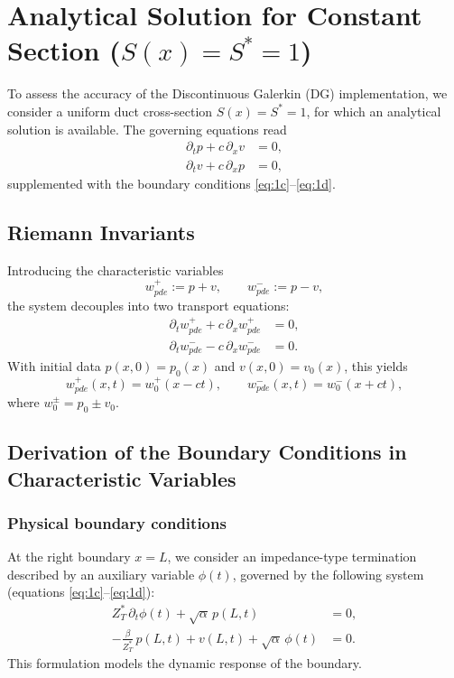 \documentclass[11pt,a4paper]{report}
\theoremstyle{plain}
\theoremstyle{definition}
\begin{document}
\section{Analytical Solution for Constant Section ($S(x)=S^\ast=1$)}

To assess the accuracy of the Discontinuous Galerkin (DG) implementation, we consider a uniform duct cross-section $S(x)=S^\ast=1$, for which an analytical solution is available. The governing equations read
\begin{align}
    \partial_t p + c\,\partial_x v &= 0, \\
    \partial_t v + c\,\partial_x p &= 0,
\end{align}
supplemented with the boundary conditions \eqref{eq:1c}--\eqref{eq:1d}.

\subsection{Riemann Invariants}

Introducing the characteristic variables
\begin{equation}
    w^+_{pde} := p+v, \qquad w^-_{pde} := p-v,
\end{equation}
the system decouples into two transport equations:
\begin{align}
    \partial_t w^+_{pde} + c\,\partial_x w^+_{pde} &= 0, \\
    \partial_t w^-_{pde} - c\,\partial_x w^-_{pde} &= 0.
\end{align}
With initial data $p(x,0)=p_0(x)$ and $v(x,0)=v_0(x)$, this yields
\begin{equation}
    w^+_{pde}(x,t) = w_0^+(x-ct), \qquad
    w^-_{pde}(x,t) = w_0^-(x+ct),
\end{equation}
where $w_0^\pm = p_0 \pm v_0$.
\subsection{Derivation of the Boundary Conditions in Characteristic Variables}

\subsubsection{Physical boundary conditions}

At the right boundary $x=L$, we consider an impedance-type termination described by an
auxiliary variable $\phi(t)$, governed by the following system (equations \eqref{eq:1c}--\eqref{eq:1d}):
\begin{align}
    Z_T^\ast \,\partial_t \phi(t) + \sqrt{\alpha}\, p(L,t) &= 0,
    \label{eq:bc_phi_phys}\\
    -\frac{\beta}{Z_T^\ast}\, p(L,t) + v(L,t) + \sqrt{\alpha}\,\phi(t) &= 0.
    \label{eq:bc_pv_phys}
\end{align}
This formulation models the dynamic response of the boundary.
\end{document}
